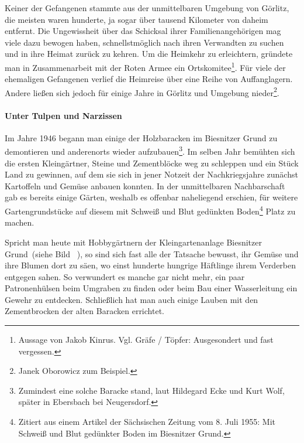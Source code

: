 Keiner der Gefangenen stammte aus der unmittelbaren Umgebung von Görlitz, die meisten waren hunderte, ja sogar über tausend Kilometer von daheim entfernt. Die Ungewissheit über das Schicksal ihrer Familienangehörigen mag viele dazu bewogen haben, schnellstmöglich nach ihren Verwandten zu suchen und in ihre Heimat zurück zu kehren. Um die Heimkehr zu erleichtern, gründete man in Zusammenarbeit mit der Roten Armee ein Ortskomitee\footnote{Aussage von Jakob Kinrus. Vgl. Gräfe / Töpfer: Ausgesondert und fast vergessen.}. Für viele der ehemaligen Gefangenen verlief die Heimreise über eine Reihe von Auffanglagern. Andere ließen sich jedoch für einige Jahre in Görlitz und Umgebung nieder\footnote{Janek Oborowicz zum Beispiel.}. 




\paragraph{Unter Tulpen und Narzissen}
Im Jahre 1946 begann man einige der Holzbaracken im Biesnitzer Grund zu demontieren und anderenorts wieder aufzubauen\footnote{Zumindest eine solche Baracke stand, laut Hildegard Ecke und Kurt Wolf, später in Ebersbach bei Neugersdorf.}. Im selben Jahr bemühten sich die ersten Kleingärtner, Steine und Zementblöcke weg zu schleppen und ein Stück Land zu gewinnen, auf dem sie sich in jener Notzeit der Nachkriegsjahre zunächst Kartoffeln und Gemüse anbauen konnten. In der unmittelbaren Nachbarschaft gab es bereits einige Gärten, weshalb es offenbar naheliegend erschien, für weitere Gartengrundstücke auf diesem mit \glqq Schweiß und Blut gedünkten Boden\grqq\footnote{Zitiert aus einem Artikel der Sächsischen Zeitung vom 8. Juli 1955: Mit Schweiß und Blut gedünkter Boden im Biesnitzer Grund.} Platz zu machen.

\newpage
Spricht man heute mit Hobbygärtnern der Kleingartenanlage \glqq Biesnitzer Grund\grqq~(siehe Bild ~), so sind sich fast alle der Tatsache bewusst, ihr Gemüse und ihre Blumen dort zu säen, wo einst hunderte hungrige Häftlinge ihrem Verderben entgegen sahen. So verwundert es manche gar nicht mehr, ein paar Patronenhülsen beim Umgraben zu finden oder beim Bau einer Wasserleitung ein Gewehr zu entdecken. Schließlich hat man auch einige Lauben mit den Zementbrocken der alten Baracken errichtet.



